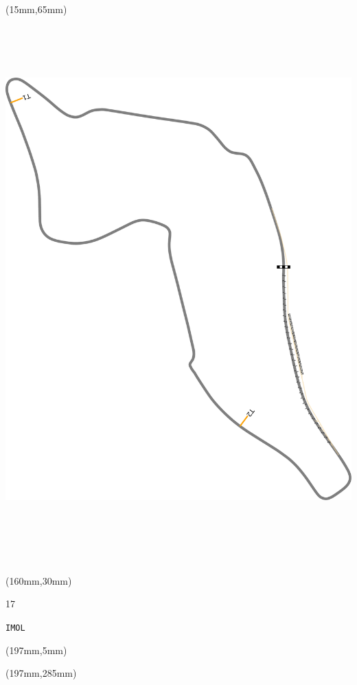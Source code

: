 \begin{textblock*}{185mm}(15mm,65mm)%
\centering
\mbox{\includegraphics[width=185mm,height=210mm,keepaspectratio]{PT/IMOL.pdf}}
\end{textblock*}
\begin{textblock*}{40mm}(160mm,30mm)%
\Large
\par{} 
\par17 
\par\hfill\tiny\tt IMOL\\
\end{textblock*}
\begin{textblock*}{20mm}(197mm,5mm)%
\fbox{\thepage}
\label{IMOL}
\end{textblock*}
\begin{textblock*}{20mm}(197mm,285mm)%
\fbox{\thepage}
\end{textblock*}

